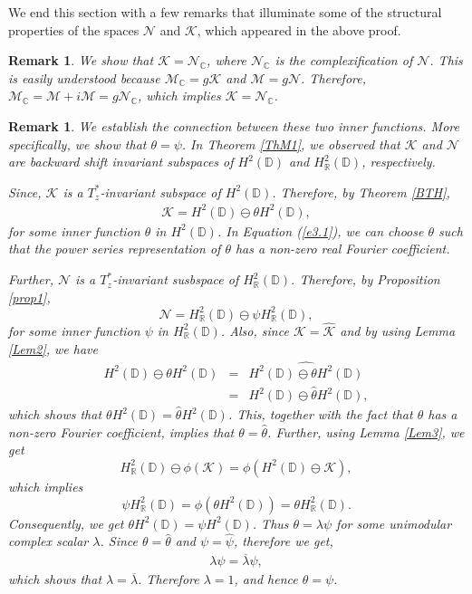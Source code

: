 \documentclass[11pt]{amsart}
\newtheorem{remark}[theorem]{Remark}
\numberwithin{equation}{section}
\begin{document}
\textnormal{We end this section with a few remarks that illuminate some of the structural properties of the spaces $\mathcal{N}$ and $\mathcal{K}$, which appeared in the above proof.}

\begin{remark}
 We show that $\mathcal{K}=\mathcal{N}_\mathbb{C}$, where $\mathcal{N}_\mathbb{C}$ is the complexification of $\mathcal{N}$. This is easily understood because $\mathcal{M}_\mathbb{C}=g\mathcal{K}$ and $\mathcal{M}=g\mathcal{N}$. Therefore, $\mathcal{M}_\mathbb{C}=\mathcal{M}+i\mathcal{M}
 =g\mathcal{N}_\mathbb{C}$,
 which implies $\mathcal{K}=\mathcal{N}_\mathbb{C}$.

\end{remark}

\begin{remark}\label{Rem3.3}
We establish the connection between these two inner functions. More specifically, we show that $\theta=\psi$.
In Theorem \ref{ThM1}, we observed that $\mathcal{K}$ and $\mathcal{N}$ are backward shift invariant subspaces of $H^2(\mathbb{D})$ and $H^2_{\mathbb{R}}(\mathbb{D})$, respectively.

Since, $\mathcal{K}$ is a $T^*_z$-invariant subspace of $H^2(\mathbb{D})$. Therefore, by Theorem \ref{BTH},
\begin{eqnarray*} \label{e3.1}
\mathcal{K}=H^2(\mathbb{D})\ominus\theta H^2(\mathbb{D}),   
\end{eqnarray*}
for some inner function $\theta$ in $H^2(\mathbb{D})$. In Equation (\ref{e3.1}), we can choose  $\theta$ such that the power series representation of $\theta$ has a non-zero real Fourier coefficient.

 Further, $\mathcal{N}$ is a $T^*_z$-invariant susbspace of $H^2_{\mathbb{R}}(\mathbb{D})$. Therefore, by Proposition \ref{prop1},
$$\mathcal{N}=H^2_{\mathbb{R}}(\mathbb{D})\ominus \psi H^2_{\mathbb{R}}(\mathbb{D}),$$
for some inner function $\psi$ in $H^2_{\mathbb{R}}(\mathbb{D})$.
Also, since $\mathcal{K}=\widehat{\mathcal{K}}$ and by using Lemma \ref{Lem2}, we have
\begin{eqnarray*}
H^2(\mathbb{D}) \ominus \theta H^2(\mathbb{D})&=&\widehat{H^2(\mathbb{D}) \ominus \theta H^2(\mathbb{D})}\\&=&H^2(\mathbb{D}) \ominus \widehat{\theta} H^2(\mathbb{D}),    
\end{eqnarray*}
which shows that $ \theta H^2(\mathbb{D})= \widehat{\theta} H^2(\mathbb{D})$. This, together with the fact that $\theta$ has a non-zero Fourier coefficient, implies that $\theta=\widehat{\theta}$.
Further, using Lemma \ref{Lem3}, we get $$H^2_{\mathbb{R}}(\mathbb{D}) \ominus \phi(\mathcal{K})=\phi(H^2(\mathbb{D})\ominus \mathcal{K}),$$
which implies $$\psi H^2_{\mathbb{R}}(\mathbb{D})=\phi(\theta H^2(\mathbb{D}))=\theta H^2_{\mathbb{R}}(\mathbb{D}).$$
Consequently, we get $\theta H^2(\mathbb{D})=\psi H^2(\mathbb{D})$.
Thus $\theta=\lambda \psi$ for some unimodular complex scalar $\lambda$. Since $\theta=\widehat{\theta}$ and $\psi=\widehat{\psi}$, therefore we get,
\begin{eqnarray*}
   \lambda \psi= \overline{\lambda}\psi,
\end{eqnarray*}
which shows that $\lambda=\overline{\lambda}$. Therefore $\lambda=1$, and hence $\theta=\psi$.


\end{remark}
\end{document}
